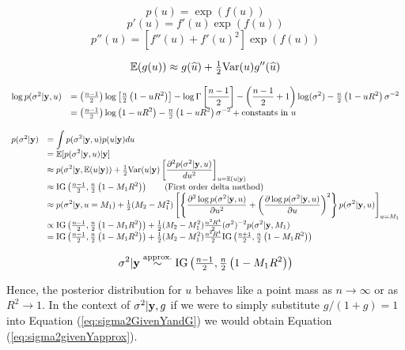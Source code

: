 \documentclass{article}[12pt]
\begin{document}
$$
p(u) = \exp(f(u))
$$
$$
p'(u) = f'(u)\exp(f(u))
$$
$$
p''(u) = [f''(u) + f'(u)^2]\exp(f(u))
$$

$$
{\mathbb E}( g(u) ) \approx g(\widehat{u})  + \tfrac{1}{2} \mbox{Var}(u) g''(\widehat{u}) 
$$


$$
\begin{array}{rll}
\log p(\sigma^2|{\bf y},u) 
& \displaystyle = \left( \tfrac{n-1}{2} \right) \log\left[
\tfrac{n}{2}\left( 1 - u R^2\right) \right]
- \log\Gamma\left[ \frac{n-1}{2} \right]
- \left( \frac{n-1}{2} + 1\right) \log(\sigma^2)
- \tfrac{n}{2}\left( 1 - u R^2\right)   \sigma^{-2}
\\
& \displaystyle = \left( \tfrac{n-1}{2} \right) \log
\left( 1 - u R^2\right) 
- \tfrac{n}{2}\left( 1 - u R^2\right)   \sigma^{-2}
+ \mbox{constants in $u$}
\end{array}
$$ 
 
$$
\begin{array}{rll}
p(\sigma^2|{\bf y}) 
& \displaystyle = \int p(\sigma^2|{\bf y},u) p(u|{\bf y}) du 
\\
& \displaystyle = 
{\mathbb E}[p(\sigma^2|{\bf y},u)|{\bf y}]
\\
& \displaystyle 
\approx p(\sigma^2|{\bf y},{\mathbb E}(u|{\bf y}))
+ \tfrac{1}{2}\mbox{Var}(u|{\bf y}) \left[ \frac{\partial^2 p(\sigma^2|{\bf y},u)}{d u^2} \right]_{u = {\mathbb E}(u|{\bf y})}
\\
& \displaystyle \approx
\mbox{IG}\left( \tfrac{n-1}{2},\tfrac{n}{2}\left( 1 - M_1 R^2\right) \right)
\qquad \mbox{(First order delta method)}
\\
& \displaystyle 
\approx p(\sigma^2|{\bf y},u=M_1)
+ \tfrac{1}{2}(M_2 - M_1^2) \left[ 
\left\{
\frac{\partial^2 \log p(\sigma^2|{\bf y},u)}{\partial u^2}
+ \left( \frac{\partial \log p(\sigma^2|{\bf y},u)}{\partial u} \right)^2
\right\}
p(\sigma^2|{\bf y},u) \right]_{u = M_1}
\\
& \displaystyle 
\propto \mbox{IG}\left( \tfrac{n-1}{2},\tfrac{n}{2}\left( 1 - M_1 R^2\right) \right)
+ \tfrac{1}{2}(M_2 - M_1^2)  
\tfrac{n^2 R^4}{2} (\sigma^2)^{-2}
p(\sigma^2|{\bf y},M_1) 
\\
& \displaystyle 
= \mbox{IG}\left( \tfrac{n-1}{2},\tfrac{n}{2}\left( 1 - M_1 R^2\right) \right)
+ \tfrac{1}{2}(M_2 - M_1^2)  
\tfrac{n^2 R^4}{2} \mbox{IG}\left( \tfrac{n+1}{2},\tfrac{n}{2}\left( 1 - M_1 R^2\right) \right)
\end{array}
$$


$$
\displaystyle \sigma^2|{\bf y}  
\stackrel{\mbox{\scriptsize approx.}}{\sim} 
\mbox{IG}\left( \tfrac{n-1}{2},\tfrac{n}{2}\left( 1 - M_1 R^2\right) \right)
$$

%	
%	
%	
%
\noindent Hence, the posterior distribution for $u$ behaves like a point mass
as $n\to \infty$ or as $R^2 \to 1$. In the context of $\sigma^2|{\bf y},g$ 
if we were to simply substitute $g/(1+g) = 1$ into Equation 
(\ref{eq:sigma2GivenYandG}) we would obtain Equation (\ref{eq:sigma2givenYapprox}).
\end{document}
